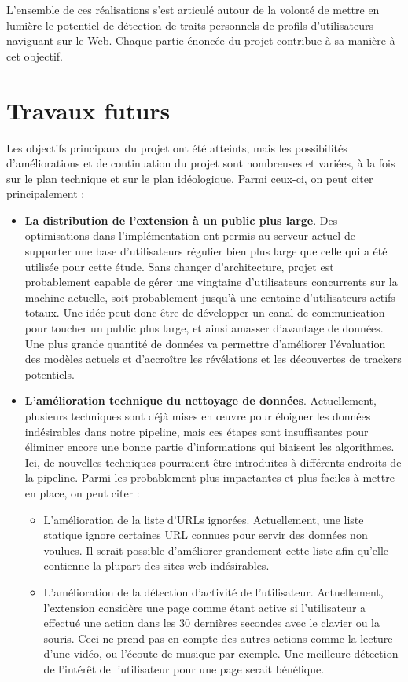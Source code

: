 		L'ensemble de ces réalisations s'est articulé autour de la volonté de mettre en lumière le potentiel de détection de traits personnels de profils d'utilisateurs naviguant sur le Web. Chaque partie énoncée du projet contribue à sa manière à cet objectif.

\section{Travaux futurs}

	Les objectifs principaux du projet ont été atteints, mais les possibilités d'améliorations et de continuation du projet sont nombreuses et variées, à la fois sur le plan technique et sur le plan idéologique. Parmi ceux-ci, on peut citer principalement :
	\begin{itemize}
		\item \textbf{La distribution de l'extension à un public plus large}. Des optimisations dans l'implémentation ont permis au serveur actuel de supporter une base d'utilisateurs régulier bien plus large que celle qui a été utilisée pour cette étude. Sans changer d'architecture, projet est probablement capable de gérer une vingtaine d'utilisateurs concurrents sur la machine actuelle, soit probablement jusqu'à une centaine d'utilisateurs actifs totaux. Une idée peut donc être de développer un canal de communication pour toucher un public plus large, et ainsi amasser d'avantage de données. Une plus grande quantité de données va permettre d'améliorer l'évaluation des modèles actuels et d'accroître les révélations et les découvertes de trackers potentiels.
		\item \textbf{L'amélioration technique du nettoyage de données}. Actuellement, plusieurs techniques sont déjà mises en œuvre pour éloigner les données indésirables dans notre pipeline, mais ces étapes sont insuffisantes pour éliminer encore une bonne partie d'informations qui biaisent les algorithmes. Ici, de nouvelles techniques pourraient être introduites à différents endroits de la pipeline. Parmi les probablement plus impactantes et plus faciles à mettre en place, on peut citer :
		\begin{itemize}
			\item L'amélioration de la liste d'URLs ignorées. Actuellement, une liste statique ignore certaines URL connues pour servir des données non voulues. Il serait possible d'améliorer grandement cette liste afin qu'elle contienne la plupart des sites web indésirables.
			\item L'amélioration de la détection d'activité de l'utilisateur. Actuellement, l'extension considère une page comme étant active si l'utilisateur a effectué une action dans les 30 dernières secondes avec le clavier ou la souris. Ceci ne prend pas en compte des autres actions comme la lecture d'une vidéo, ou l'écoute de musique par exemple. Une meilleure détection de l'intérêt de l'utilisateur pour une page serait bénéfique.

\end{itemize}
\end{itemize}
